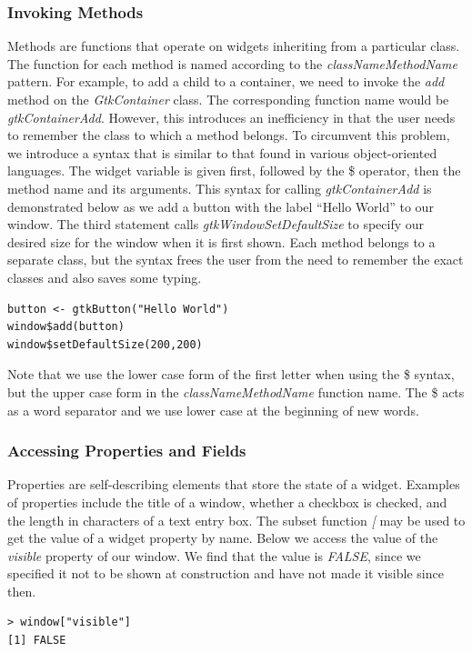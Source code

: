 \documentclass[article]{jss}
\begin{document}
\subsubsection{Invoking Methods}

Methods are functions that operate on widgets inheriting from a
particular class.
The  function for each  method is named according
to the 
\emph{classNameMethodName} pattern. For example, to add a child to a
container, we 
need to invoke the \emph{add} method on the \emph{GtkContainer} class. 
The corresponding function name would be \emph{gtkContainerAdd}.
However, this 
introduces an inefficiency in that the user needs to remember the
class to which
a method belongs. To circumvent this problem, we introduce a syntax
that is similar
to that found in various object-oriented languages. The widget
variable is given first, followed by the \$ operator, then the method
name and its arguments. This syntax for calling \emph{gtkContainerAdd}
is demonstrated 
below as we add a button with the label ``Hello World'' to our window.
The
third statement calls \emph{gtkWindowSetDefaultSize} to specify our
desired
size for the window when it is first shown. Each method belongs to a
separate
class, but the syntax frees the user from the need to remember the
exact classes
and also saves some typing.
\begin{verbatim}
button <- gtkButton("Hello World")
window$add(button)
window$setDefaultSize(200,200)
\end{verbatim}
Note that we use the lower case form of the first letter when using
the \$ syntax, but the upper case form in the
\emph{classNameMethodName} function name. The \$ acts as a word
separator and we use lower case at the beginning of new words.



\subsubsection{Accessing Properties and Fields}

Properties are self-describing elements that store the state of a
widget.
Examples of properties include the title of a window, whether a
checkbox is checked, and
the length in characters of a text entry box. The  subset
function 
\emph{[} may be used to get the value of a widget property by name.
Below we access the value of the \emph{visible} property of our
window. We
find that the value is \emph{FALSE}, since we specified it not to be
shown
at construction and have not made it visible since then.
\begin{verbatim}
> window["visible"]
[1] FALSE
\end{verbatim}
\end{document}
